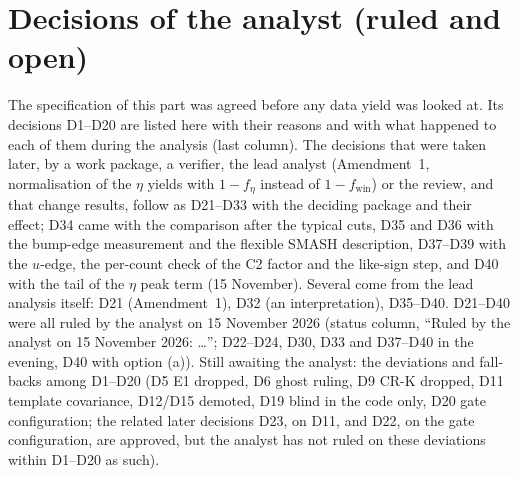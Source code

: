 \documentclass[11pt,a4paper]{article}
\newcommand{\feta}{\ensuremath{f_\eta}\xspace}
\newcommand{\fwin}{\ensuremath{f_{\mathrm{win}}}\xspace}
\begin{document}
\section{Decisions of the analyst (ruled and open)}
\label{sec:decisions}
The specification of this part was agreed before any data yield was looked at. Its decisions D1--D20 are listed here with their
reasons and with what happened to each of them during the analysis (last column). The decisions that were taken later, by a work
package, a verifier, the lead analyst (Amendment~1, normalisation of the $\eta$ yields with $1-\feta$ instead of $1-\fwin$) or the review,
and that change results, follow as D21--D33 with the deciding package and their effect; D34 came with the comparison after the typical cuts,
D35 and D36 with the bump-edge measurement and the flexible SMASH description, D37--D39 with the $u$-edge, the per-count check of the C2
factor and the like-sign step, and D40 with the tail of the $\eta$ peak term (15 November). Several come from the lead analysis itself: D21
(Amendment~1), D32 (an interpretation), D35--D40.
D21--D40 were all ruled by the analyst on 15 November 2026 (status column, ``Ruled by the analyst on 15 November 2026: \dots''; D22--D24, D30,
D33 and D37--D40 in the evening, D40 with option (a)). Still awaiting the analyst: the deviations and fall-backs among D1--D20 (D5 E1 dropped, D6
ghost ruling, D9 CR-K dropped, D11 template covariance, D12/D15 demoted, D19 blind in the code only, D20 gate configuration; the related later
decisions D23, on D11, and D22, on the gate configuration, are approved, but the analyst has not ruled on these deviations within D1--D20 as such).
\end{document}
